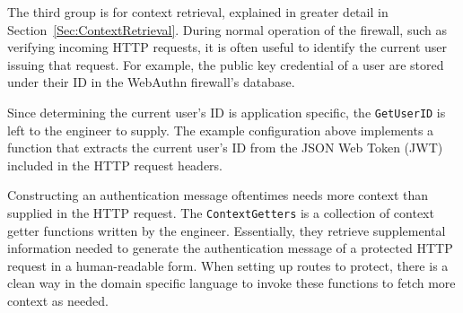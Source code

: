 The third group is for context retrieval, explained in greater detail in Section~\ref{Sec:ContextRetrieval}. During normal operation of the firewall, such as verifying incoming HTTP requests, it is often useful to identify the current user issuing that request. For example, the public key credential of a user are stored under their ID in the WebAuthn firewall's database. 

Since determining the current user's ID is application specific, the \lstinline{GetUserID} is left to the engineer to supply. The example configuration above implements a function that extracts the current user's ID from the JSON Web Token (JWT) included in the HTTP request headers.

Constructing an authentication message oftentimes needs more context than supplied in the HTTP request. The \lstinline{ContextGetters} is a collection of context getter functions written by the engineer. Essentially, they retrieve supplemental information needed to generate the authentication message of a protected HTTP request in a human-readable form. When setting up routes to protect, there is a clean way in the domain specific language to invoke these functions to fetch more context as needed.







